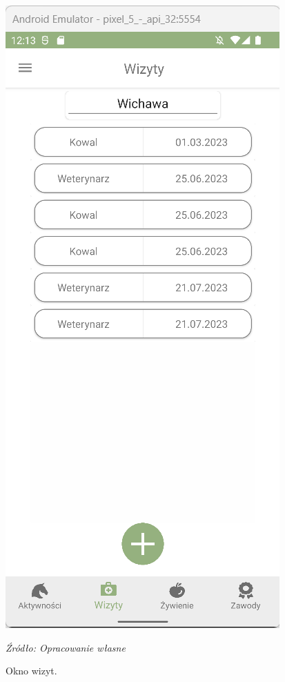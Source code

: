 \documentclass[12pt,twoside]{report}
\begin{document}
\begin{figure}[H]
	\begin{center}
	\begin{minipage}{5cm}
		\centering
		\includegraphics[scale=0.6]{VisitView}
		\caption{\centering Okno wizyt.}
		\textit{Źródło: Opracowanie własne}
		\label{VisitView}
	\end{minipage}
	\hfil
	\begin{minipage}{5cm}
		\centering

\end{minipage}
\end{center}
\end{figure}
\end{document}

